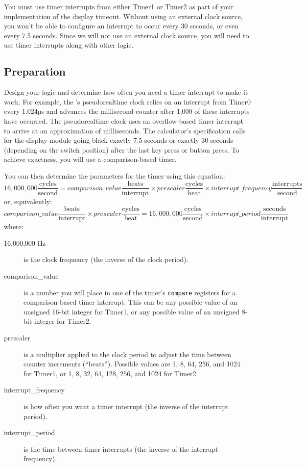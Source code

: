 You must use timer interrupts from either Timer1 or Timer2 as part of your
implementation of the display timeout. Without using an external clock source,
you won't be able to configure an interrupt to occur every 30 seconds, or even
every 7.5 seconds. Since we will not use an external clock source, you will need
to use timer interrupts along with other logic.

\subsection{Preparation}

Design your logic and determine how often you need a timer interrupt to make it
work. For example, the \nano's pseudorealtime clock relies on an interrupt from
Timer0 every 1.024µs and advances the millisecond counter after 1,000 of these
interrupts have occurred. The pseudorealtime clock uses an overflow-based timer
interrupt to arrive at an approximation of milliseconds. The calculator's
specification calls for the display module going black exactly 7.5 seconds or
exactly 30 seconds (depending on the switch position) after the last key press
or button press. To achieve exactness, you will use a comparison-based timer.

You can then determine the parameters for the timer using
this equation:
\[
16,000,000 \frac{\mathrm{cycles}}{\mathrm{second}} =
    comparison\_value \frac{\mathrm{beats}}{\mathrm{interrupt}} \times
    prescaler \frac{\mathrm{cycles}}{\mathrm{beat}} \times
    interrupt\_frequency \frac{\mathrm{interrupts}}{\mathrm{second}}
\]
or, equivalently:
\[
    comparison\_value \frac{\mathrm{beats}}{\mathrm{interrupt}} \times
    prescaler \frac{\mathrm{cycles}}{\mathrm{beat}} =
    16,000,000 \frac{\mathrm{cycles}}{\mathrm{second}} \times
    interrupt\_period \frac{\mathrm{seconds}}{\mathrm{interrupt}}
\]
where:
    \begin{description}
    \item [16,000,000 Hz] is the clock frequency (the inverse of the clock
        period).
    \item [comparison\_value] is a number you will place in one of the
        timer's \texttt{compare} registers for a comparison-based timer
        interrupt. This can be any possible value of an unsigned 16-bit integer
        for Timer1, or any possible value of an unsigned 8-bit integer for
        Timer2.
    \item [prescaler] is a multiplier applied to the clock period to adjust the
        time between counter increments (``beats''). Possible values are 1, 8,
        64, 256, and 1024 for Timer1, or 1, 8, 32, 64, 128, 256, and 1024 for
        Timer2.
    \item [interrupt\_frequency] is how often you want a timer interrupt (the
        inverse of the interrupt period).
    \item [interrupt\_period] is the time between timer interrupts (the
        inverse of the interrupt frequency).
    \end{description}

